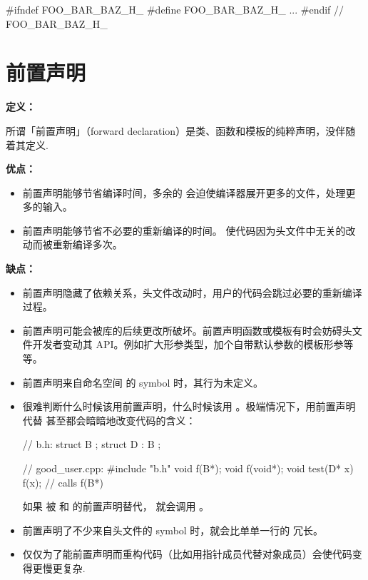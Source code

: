 \begin{cppcode}
  #ifndef FOO_BAR_BAZ_H_
  #define FOO_BAR_BAZ_H_
  ...
  #endif // FOO_BAR_BAZ_H_
\end{cppcode}

\section{前置声明} \label{forward-declarations}


\textbf{定义：}

所谓「前置声明」（forward declaration）是类、函数和模板的纯粹声明，没伴随着其定义.

\textbf{优点：}

\begin{itemize}
	\item 前置声明能够节省编译时间，多余的  会迫使编译器展开更多的文件，处理更多的输入。
	\item 前置声明能够节省不必要的重新编译的时间。  使代码因为头文件中无关的改动而被重新编译多次。
\end{itemize}

\textbf{缺点：}

\begin{itemize}
	\item 前置声明隐藏了依赖关系，头文件改动时，用户的代码会跳过必要的重新编译过程。
	\item 前置声明可能会被库的后续更改所破坏。前置声明函数或模板有时会妨碍头文件开发者变动其 API。例如扩大形参类型，加个自带默认参数的模板形参等等。
	\item 前置声明来自命名空间  的 symbol 时，其行为未定义。
	\item 很难判断什么时候该用前置声明，什么时候该用  。极端情况下，用前置声明代替  甚至都会暗暗地改变代码的含义：

\begin{cppcode}
// b.h:
struct B {};
struct D : B {};

// good_user.cpp:
#include "b.h"
void f(B*);
void f(void*);
void test(D* x) { f(x); }  // calls f(B*)
\end{cppcode}

	      如果  被  和  的前置声明替代，  就会调用  。	\item 前置声明了不少来自头文件的 symbol 时，就会比单单一行的  冗长。
	\item 仅仅为了能前置声明而重构代码（比如用指针成员代替对象成员）会使代码变得更慢更复杂.
\end{itemize}

